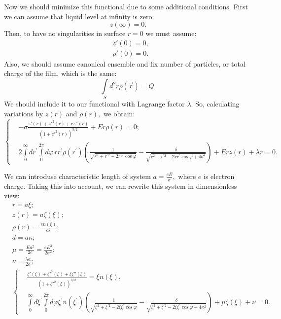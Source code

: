 \documentclass[10pt]{article}
\begin{document}
Now we should minimize this functional due to some additional conditions. First we can assume that liquid level at infinity is zero:
\begin{equation}
  z(\infty) = 0 \label{boundary_z_0}.
\end{equation}
Then, to have no singularities in surface $r=0$ we must assume:
\begin{eqnarray}
  &z'(0) = 0, \label{boundary_z_infty}\\
  &\rho'(0) = 0 \label{boundary_rho_0}.  
\end{eqnarray}
Also, we should assume canonical ensemble and fix number of particles, or total charge of the film, which is the same:
\begin{equation}
  \int\limits_S d^2 r \rho(\vec{r}) = Q.
\end{equation}
We should include it to our functional with Lagrange factor $\lambda$. So, calculating variations by $z(r)$ and $\rho(r),$ we obtain:
\begin{equation}
  \left\{
    \begin{aligned}
      &-\sigma \frac{z'(r) + z'^3(r) + r z''(r)}{(1+z'^2(r))^{3/2}} + E r \rho(r) = 0;\\
      &2 \int\limits_0^\infty dr^{\prime} \int\limits_0^{2\pi} d\varphi \, r r^{\prime} \rho(r^{\prime}) \left( \frac{1}{ \sqrt{r^2 + r^{\prime 2} - 2 r r^{\prime} \cos \varphi}} - \frac{\delta}{ \sqrt{ r^2 + r^{\prime 2} - 2 r r^{\prime} \cos \varphi + 4 d^2 } } \right) + E r z(r) + \lambda r = 0.
    \end{aligned}
  \right.
\end{equation}

We can introduse characteristic length of system $ a = \frac{e E}{\sigma}, $ where $e$ is electron charge. Taking this into account, we can rewrite this system in dimensionless view:
\begin{eqnarray}
  &r = a \xi;\nonumber\\
  &z(r) = a \zeta (\xi);\nonumber\\
  &\rho(r) = \frac{e n(\xi)}{a^2};\nonumber\\
  &d = a \kappa;\nonumber\\
  &\mu = \frac{E a^2}{2 e} = \frac{e E^3}{2 \sigma^2};\nonumber\\
  &\nu = \frac{\lambda a}{2 e};\nonumber\\
  &\left\{
    \begin{aligned}
      &\frac{\zeta'(\xi) + \zeta'^3(\xi) + \xi \zeta''(\xi)}{(1+\zeta'^2(\xi))^{3/2}} = \xi n(\xi),\\
      &\int\limits_0^\infty d \xi^{\prime} \int\limits_0^{2 \pi} d \varphi \xi^{\prime} n( \xi^{\prime} ) \left( \frac{1}{ \sqrt{\xi^2 + \xi^{\prime 2} - 2 \xi \xi^{\prime} \cos \varphi}} - \frac{\delta}{ \sqrt{ \xi^2 + \xi^{\prime 2} - 2 \xi \xi^{\prime} \cos \varphi + 4 \kappa^2 } } \right) + \mu \zeta(\xi) + \nu = 0.
    \end{aligned}
    \label{system_dimensionless}
  \right.  
\end{eqnarray}
\end{document}
